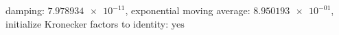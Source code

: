 damping: $\num[scientific-notation=true]{7.978934e-11}$, exponential moving average: $\num[scientific-notation=true]{8.950193e-01}$, initialize Kronecker factors to identity: $\text{yes}$
